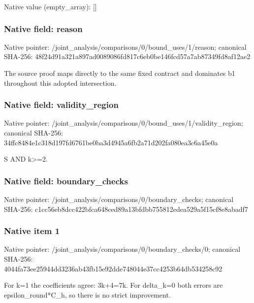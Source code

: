 \documentclass[10pt,a4paper]{article}
\begin{document}
Native value (empty\_\allowbreak{}array): []

\subsubsection{Native field: reason}
Native pointer: /joint\_\allowbreak{}analysis/comparisons/0/bound\_\allowbreak{}uses/1/reason; canonical SHA-256: 48f24d91a321a897ad0089086fd817c6eb0be146fcd57a7ab87349fd8af12ae2

\begingroup\raggedright\sloppy The source proof maps directly to the same fixed contract and dominates b1 throughout this adopted intersection.\par\endgroup

\subsubsection{Native field: validity\_\allowbreak{}region}
Native pointer: /joint\_\allowbreak{}analysis/comparisons/0/bound\_\allowbreak{}uses/1/validity\_\allowbreak{}region; canonical SHA-256: 34ffc8484e1c318d197fd6761be0ba3d4945a6fb2a71d202fa080ea3c6a45e0a

\begingroup\raggedright\sloppy S AND k>=\allowbreak{}2.\par\endgroup

\subsubsection{Native field: boundary\_\allowbreak{}checks}
Native pointer: /joint\_\allowbreak{}analysis/comparisons/0/boundary\_\allowbreak{}checks; canonical SHA-256: c1cc56eb8dcc422bfca648ced89a13bfdbb755812edea529a5f15cf8e8abadf7

\subsubsection{Native item 1}
Native pointer: /joint\_\allowbreak{}analysis/comparisons/0/boundary\_\allowbreak{}checks/0; canonical SHA-256: 4044fa73ee25944dd3236ab43fb15e92dde748044e37cc4253b64db534258c92

\begingroup\raggedright\sloppy For k=\allowbreak{}1 the coefficients agree:\allowbreak{} 3k+4=\allowbreak{}7k. For delta\_\allowbreak{}k=\allowbreak{}0 both errors are epsilon\_\allowbreak{}round*C\_\allowbreak{}h,\allowbreak{} so there is no strict improvement.\par\endgroup
\end{document}
